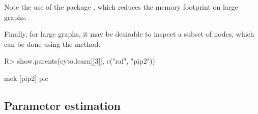 \documentclass[article]{jss}
\renewcommand{\|}{\,|\,}
\begin{document}
%
Note the use of the  package \citep{bates2017}, which reduces the memory footprint on large graphs.

Finally, for large graphs, it may be desirable to inspect a subset of nodes, which can be done using the  method:
%
\begin{CodeChunk}
\begin{CodeInput}
R> show.parents(cyto.learn[[3]], c("raf", "pip2"))
\end{CodeInput}
\begin{CodeOutput}
[raf]   mek   
[pip2]  plc  
\end{CodeOutput}
\end{CodeChunk}
%
\subsection{Parameter estimation}
\label{subsec:inference}
\end{document}
